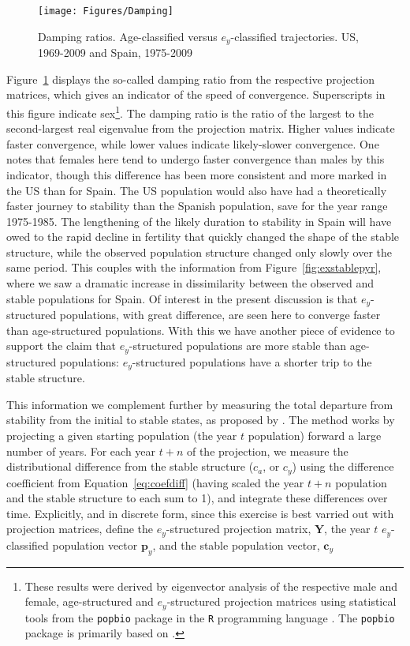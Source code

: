 \begin{figure}[ht!]
       \centering
       \caption{Damping ratios. Age-classified versus $e_y$-classified
       trajectories. US, 1969-2009 and Spain, 1975-2009}
        \texttt{[image: Figures/Damping]}
        \label{fig:damping}
\end{figure}

Figure~\ref{fig:damping} displays the so-called damping ratio from the
respective projection matrices, which gives an indicator of the speed of
convergence. Superscripts in this figure indicate sex\footnote{These results
were derived by eigenvector analysis of the respective male and female, age-structured and
$e_y$-structured projection matrices using statistical tools from the
\texttt{popbio} package \citep{popbio2007} in the
\texttt{R} programming language \citep{Rcitation}. The \texttt{popbio} package
is primarily based on \citet{caswell2001matrix}.}. The damping ratio is the 
ratio of the largest to the second-largest real eigenvalue from the projection 
matrix\citep[p101]{caswell2001matrix}. Higher values indicate faster 
convergence, while lower values indicate likely-slower convergence. One notes 
that females here tend to undergo faster convergence than
males by this indicator, though this difference has been more consistent and
more marked in the US than for Spain. The US population would also have had a
theoretically faster journey to stability than the Spanish population, save for
the year range 1975-1985. The lengthening of the likely duration to stability in
Spain will have owed to the rapid decline in fertility that quickly changed the
shape of the stable structure, while the observed population structure
changed only slowly over the same period. This couples with the information
from Figure~\ref{fig:exstablepyr}, where we saw a dramatic increase in
dissimilarity between the observed and stable populations for Spain. Of interest
in the present discussion is that $e_y$-structured populations, with great difference, 
are seen here to converge faster than age-structured populations. With this we 
have another piece of evidence to support the claim that $e_y$-structured populations are more stable than
age-structured populations: $e_y$-structured populations have a shorter
trip to the stable structure.

This information we complement further by measuring the total departure from
stability from the initial to stable states, as proposed by
\citet{cohen1979cumulative}. The method works by projecting a given starting
population (the year $t$ population) forward a large number of years. For each
year $t+n$ of the projection, we measure the distributional difference from
the stable structure ($c_a$, or $c_y$) using the difference coefficient from
Equation~\ref{eq:coefdiff} (having scaled the year $t+n$ population and the
stable structure to each sum to 1), and integrate these differences over time.
Explicitly, and in discrete form, since this exercise is best varried out with
projection matrices, define the $e_y$-structured projection matrix,
$\textbf{Y}$, the year $t$ $e_y$-classified population vector
$\textbf{p}_y$, and the stable population vector, $\textbf{c}_y$

